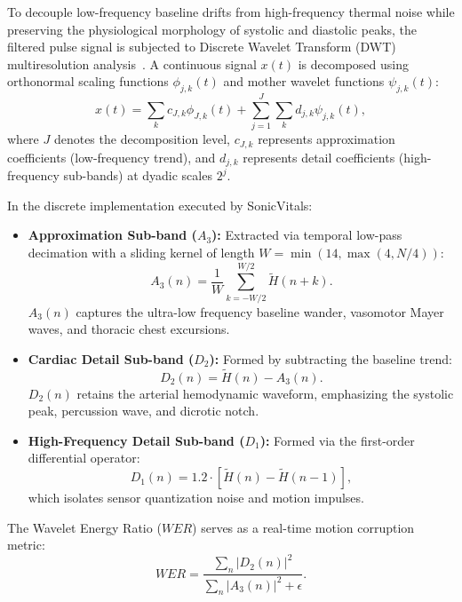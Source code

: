 \documentclass[journal]{IEEEtran}
\begin{document}
To decouple low-frequency baseline drifts from high-frequency thermal noise while preserving the physiological morphology of systolic and diastolic peaks, the filtered pulse signal is subjected to Discrete Wavelet Transform (DWT) multiresolution analysis~\cite{ref18}. A continuous signal $x(t)$ is decomposed using orthonormal scaling functions $\phi_{j,k}(t)$ and mother wavelet functions $\psi_{j,k}(t)$:
\begin{equation}
    x(t) = \sum_{k} c_{J,k} \phi_{J,k}(t) + \sum_{j=1}^J \sum_{k} d_{j,k} \psi_{j,k}(t),
    \label{eq:wavelet}
\end{equation}
where $J$ denotes the decomposition level, $c_{J,k}$ represents approximation coefficients (low-frequency trend), and $d_{j,k}$ represents detail coefficients (high-frequency sub-bands) at dyadic scales $2^j$.

In the discrete implementation executed by SonicVitals:
\begin{itemize}
    \item \textbf{Approximation Sub-band ($A_3$):} Extracted via temporal low-pass decimation with a sliding kernel of length $W = \min(14, \max(4, N/4))$:
    \begin{equation}
        A_3(n) = \frac{1}{W} \sum_{k=-W/2}^{W/2} \tilde{H}(n+k).
    \end{equation}
    $A_3(n)$ captures the ultra-low frequency baseline wander, vasomotor Mayer waves, and thoracic chest excursions.
    \item \textbf{Cardiac Detail Sub-band ($D_2$):} Formed by subtracting the baseline trend:
    \begin{equation}
        D_2(n) = \tilde{H}(n) - A_3(n).
    \end{equation}
    $D_2(n)$ retains the arterial hemodynamic waveform, emphasizing the systolic peak, percussion wave, and dicrotic notch.
    \item \textbf{High-Frequency Detail Sub-band ($D_1$):} Formed via the first-order differential operator:
    \begin{equation}
        D_1(n) = 1.2 \cdot [\tilde{H}(n) - \tilde{H}(n-1)],
    \end{equation}
    which isolates sensor quantization noise and motion impulses.
\end{itemize}

The Wavelet Energy Ratio ($WER$) serves as a real-time motion corruption metric:
\begin{equation}
    WER = \frac{\sum_{n} |D_2(n)|^2}{\sum_{n} |A_3(n)|^2 + \epsilon}.
    \label{eq:wer}
\end{equation}
\end{document}
